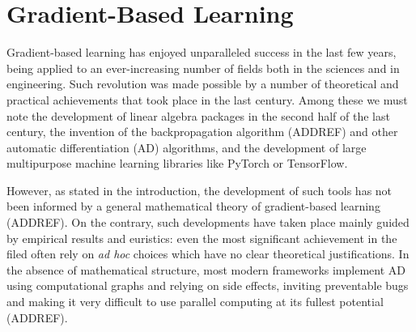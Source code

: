\documentclass[12pt,a4paper,openright,twoside]{report}
\theoremstyle{plain}
\theoremstyle{definition}
\begin{document}


\chapter{Gradient-Based Learning}
\lhead[\fancyplain{}{\bfseries\thepage}]{\fancyplain{}{\bfseries\rightmark}}





Gradient-based learning has enjoyed unparalleled success in the last few years, being applied to an ever-increasing number of fields both in the sciences and in engineering. Such revolution was made possible by a number of theoretical and practical achievements that took place in the last century. Among these we must note the development of linear algebra packages in the second half of the last century, the invention of the backpropagation algorithm (ADDREF) and other automatic differentiation (AD) algorithms, and the development of large multipurpose machine learning libraries like PyTorch or TensorFlow.


However, as stated in the introduction, the development of such tools has not been informed by a general mathematical theory of gradient-based learning (ADDREF). On the contrary, such developments have taken place mainly guided by empirical results and euristics: even the most significant achievement in the filed often rely on \textit{ad hoc} choices which have no clear theoretical justifications. In the absence of mathematical structure, most modern frameworks implement AD using computational graphs and relying on side effects, inviting preventable bugs and making it very difficult to use parallel computing at its fullest potential (ADDREF).
\end{document}
